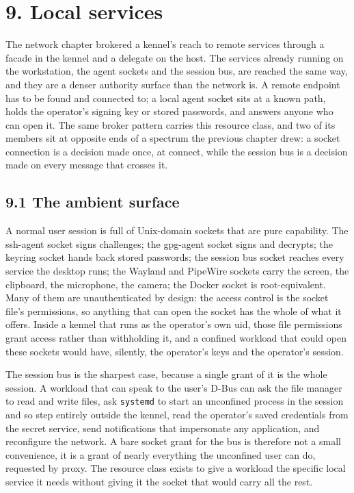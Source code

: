 \hypertarget{local-services}{%
\chapter{9. Local services}\label{local-services}}

The network chapter brokered a kennel's reach to remote services through
a facade in the kennel and a delegate on the host. The services already
running on the workstation, the agent sockets and the session bus, are
reached the same way, and they are a denser authority surface than the
network is. A remote endpoint has to be found and connected to; a local
agent socket sits at a known path, holds the operator's signing key or
stored passwords, and answers anyone who can open it. The same broker
pattern carries this resource class, and two of its members sit at
opposite ends of a spectrum the previous chapter drew: a socket
connection is a decision made once, at connect, while the session bus is
a decision made on every message that crosses it.

\hypertarget{the-ambient-surface}{%
\section{9.1 The ambient surface}\label{the-ambient-surface}}

A normal user session is full of Unix-domain sockets that are pure
capability. The ssh-agent socket signs challenges; the gpg-agent socket
signs and decrypts; the keyring socket hands back stored passwords; the
session bus socket reaches every service the desktop runs; the Wayland
and PipeWire sockets carry the screen, the clipboard, the microphone,
the camera; the Docker socket is root-equivalent. Many of them are
unauthenticated by design: the access control is the socket file's
permissions, so anything that can open the socket has the whole of what
it offers. Inside a kennel that runs as the operator's own uid, those
file permissions grant access rather than withholding it, and a confined
workload that could open these sockets would have, silently, the
operator's keys and the operator's session.

The session bus is the sharpest case, because a single grant of it is
the whole session. A workload that can speak to the user's D-Bus can ask
the file manager to read and write files, ask \texttt{systemd} to start
an unconfined process in the session and so step entirely outside the
kennel, read the operator's saved credentials from the secret service,
send notifications that impersonate any application, and reconfigure the
network. A bare socket grant for the bus is therefore not a small
convenience, it is a grant of nearly everything the unconfined user can
do, requested by proxy. The resource class exists to give a workload the
specific local service it needs without giving it the socket that would
carry all the rest.

